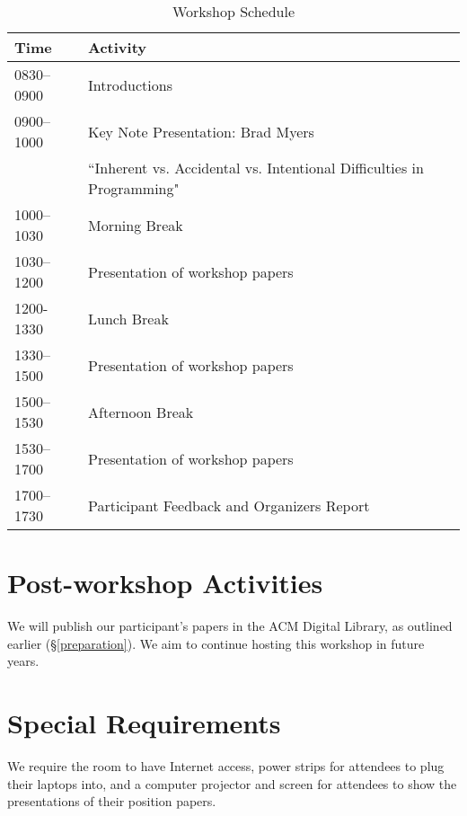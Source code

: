 \documentclass[authorpermission]{sigplanconf}
\begin{document}
\begin{table} [!htbp] %
\begin{tabularx}{\columnwidth}{l|X}
\textbf{Time}   & \textbf{Activity} \\
\hline
0830--0900    & Introductions \vspace{1mm} \\
0900--1000    & Key Note Presentation: Brad Myers \vspace{1mm} \\
                       &``Inherent vs. Accidental vs. Intentional Difficulties in Programming"\\
1000--1030     & Morning Break~\vspace{1mm}\\
1030--1200   & Presentation of workshop papers \vspace{1mm}\\
1200-1330     & Lunch Break~\vspace{1mm}\\
1330--1500   & Presentation of workshop papers \vspace{1mm}\\
1500--1530    & Afternoon Break~\vspace{1mm}\\
1530--1700    & Presentation of workshop papers \vspace{1mm}\\
1700--1730    & Participant Feedback and Organizers Report  \\
\end{tabularx}
\caption{Workshop Schedule}
\label{tab:schedule}
\end{table}

\section{Post-workshop Activities}

We will publish our participant's papers in the ACM Digital Library, as outlined earlier (\S \ref{preparation}). We aim to continue hosting this workshop in future years.

\section{Special Requirements}

We require the room to have Internet access, power strips for
attendees to plug their laptops into, and a computer projector and
screen for attendees to show the presentations of their position
papers.
\end{document}
